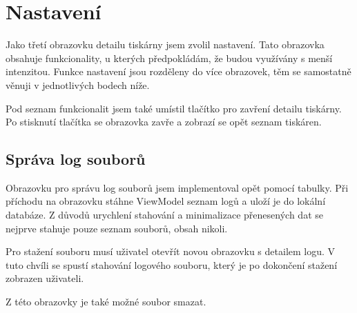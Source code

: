 \section{Nastavení}

Jako třetí obrazovku detailu tiskárny jsem zvolil nastavení.
Tato obrazovka obsahuje funkcionality, u kterých předpokládám, že budou využívány s menší intenzitou.
Funkce nastavení jsou rozděleny do více obrazovek, těm se samostatně věnuji v jednotlivých bodech níže.

Pod seznam funkcionalit jsem také umístil tlačítko pro zavření detailu tiskárny.
Po stisknutí tlačítka se obrazovka zavře a zobrazí se opět seznam tiskáren.

\subsection{Správa log souborů}

Obrazovku pro správu log souborů jsem implementoval opět pomocí tabulky.
Při příchodu na obrazovku stáhne ViewModel seznam logů a uloží je do lokální databáze.
Z důvodů urychlení stahování a minimalizace přenesených dat se nejprve stahuje pouze seznam souborů, obsah nikoli.

Pro stažení souboru musí uživatel otevřít novou obrazovku s detailem logu.
V tuto chvíli se spustí stahování logového souboru, který je po dokončení stažení zobrazen uživateli.

Z této obrazovky je také možné soubor smazat.
